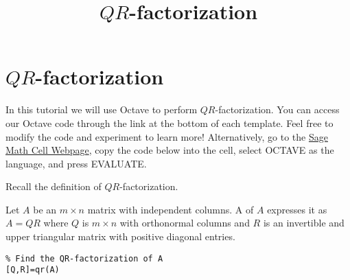 \documentclass{ximera}
\title{$QR$-factorization} \license{CC BY-NC-SA 4.0}
\begin{document}
\begin{abstract}
\end{abstract}
\maketitle
\section*{$QR$-factorization}

In this tutorial we will use Octave to perform $QR$-factorization. You can access our Octave code through the link at the bottom of each template.  Feel free to modify the code and experiment to learn more!  Alternatively, go to the \href{https://sagecell.sagemath.org/}{Sage Math Cell Webpage}, copy the code below into the cell, select OCTAVE as the language, and press EVALUATE.  

Recall the definition of $QR$-factorization.
\begin{definition}[\ref{def:QR-factorization}]
Let $A$ be an $m \times n$ matrix with independent columns. A  of $A$ expresses it as $A = QR$ where $Q$ is $m \times n$ with orthonormal columns and $R$ is an invertible and upper triangular matrix with positive diagonal entries.
\end{definition}

\begin{template}\label{temp:qr}

\begin{verbatim}
% Find the QR-factorization of A
[Q,R]=qr(A)
\end{verbatim}
\end{template}
\end{document}
